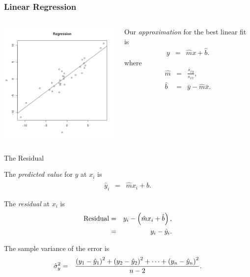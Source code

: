 \begin{frame}
  \frametitle{Linear Regression}

    \begin{columns}

      \centerline{\includegraphics[width=6cm]{img/regressionGeneral}}

      
      Our \textit{approximation} for the best linear fit is
      \begin{eqnarray*}
        y & = & \hat{m} x + \hat{b}.
      \end{eqnarray*}
      where
      \begin{eqnarray*}
        \hat{m} & = & \frac{s_{xy}}{s_{xx}}, \\
        \hat{b} & = & \bar{y} - \hat{m} \bar{x}.
      \end{eqnarray*}

    \end{columns}

\end{frame}


\begin{frame}{The Residual}

  \begin{definition}
    The \textit{\color{red} predicted value} for $y$ at $x_i$ is
    \begin{eqnarray*}
      \hat{y}_i & = & \hat{m} x_i + \hat{b}.
    \end{eqnarray*}

    The \textit{\color{red} residual} at $x_i$ is 
    \begin{eqnarray*}
      \mathrm{Residual} & = & y_i - \left( \hat{m} x_i + \hat{b} \right), \\
      & = & y_i - \hat{y}_i.
    \end{eqnarray*}

  \end{definition}

  {

    \begin{definition}
      The sample variance of the error is 
      \begin{eqnarray*}
        \hat{\sigma}^2_y & = & \frac{\left( y_1 - \hat{y}_1\right)^2 + \left( y_2 - \hat{y}_2\right)^2 + \cdots + \left( y_n - \hat{y}_n\right)^2 }{n-2}.
      \end{eqnarray*}
    \end{definition}

  }
  
\end{frame}

